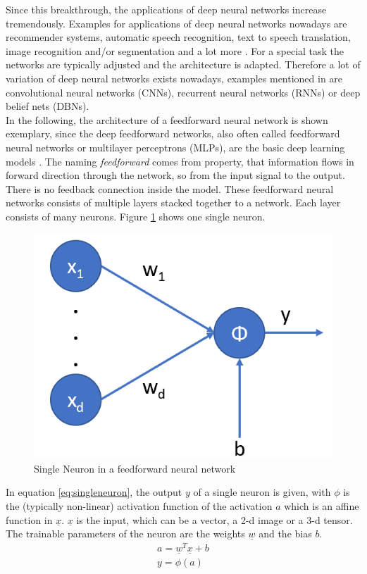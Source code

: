 \documentclass[12pt,DIV14,BCOR12mm,a4paper,footexclude,headinclude,halfparskip-,twoside,openright,cleardoubleempty,idxtotoc,bibtotoc,listtotoc,abstracton]{scrreprt} %
\numberwithin{equation}{chapter}
\begin{document}
Since this breakthrough, the applications of deep neural networks increase tremendously. Examples for applications of deep neural networks nowadays are recommender systems, automatic speech recognition, text to speech translation, image recognition and/or segmentation and a lot more \cite{DeepLearningDive}. For a special task the networks are typically adjusted and the architecture is adapted. Therefore a lot of variation of deep neural networks exists nowadays, examples mentioned in \cite{Nielsen-Michael} are convolutional neural networks (CNNs), recurrent neural networks (RNNs) or deep belief nets (DBNs).\\
In the following, the architecture of a feedforward neural network is shown exemplary, since the deep feedforward networks, also often called feedforward neural networks or multilayer perceptrons (MLPs), are the basic deep learning models \cite{Goodfellow-et-al-2016}. The naming \textit{feedforward} comes from property, that information flows in forward direction through the network, so from the input signal to the output. There is no feedback connection inside the model. These feedforward neural networks consists of multiple layers stacked together to a network. Each layer consists of many neurons. Figure \ref{fig:SingleNeuron} shows one single neuron.
\begin{figure}[htb!]
	\centering
	\includegraphics[width=0.3\linewidth]{Graphiken/SingleNeuron}
	\caption{Single Neuron in a feedforward neural network}
	\label{fig:SingleNeuron}
\end{figure}
In equation \ref{eq:singleneuron}, the output $y$ of a single neuron is given, with $\phi$ is the (typically non-linear) activation function of the activation $a$ which is an affine function in $\underline{x}$. $\underline{x}$ is the input, which can be a vector, a 2-d image or a 3-d tensor. The trainable parameters of the neuron are the weights $\underline{w}$ and the bias $b$.
\begin{align}
	a = \underline{w}{^T}\underline{x}+b\\
	y = \phi(a) \label{eq:singleneuron}
\end{align}
\end{document}
